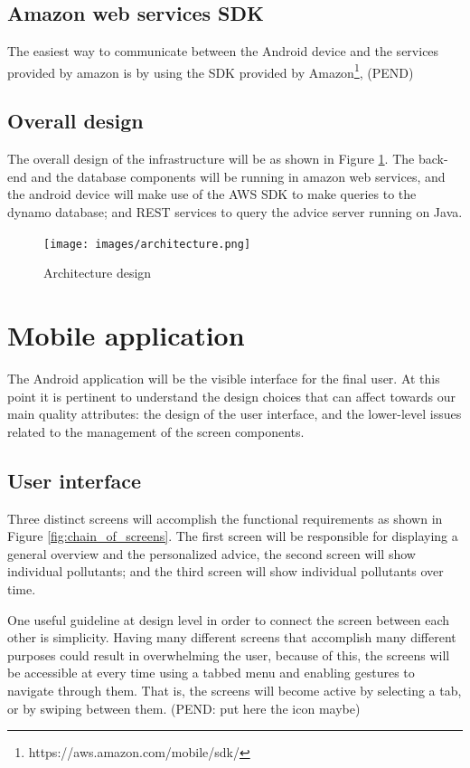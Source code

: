 \subsection{Amazon web services SDK}
The easiest way to communicate between the Android device and the services provided by amazon is by using the SDK provided by Amazon\footnote{https://aws.amazon.com/mobile/sdk/}, (PEND)

\subsection{Overall design}
The overall design of the infrastructure will be as shown in Figure \ref{fig:architecture}. The back-end and the database components will be running in amazon web services, and the android device will make use of the AWS SDK to make queries to the dynamo database; and REST services to query the advice server running on Java.

\begin{figure}[H]
\begin{adjustbox}{width=.8\textwidth,center=\textwidth}
  \centering
  \texttt{[image: images/architecture.png]}
\end{adjustbox}
  \caption[Architecture design]{Architecture design}
  \label{fig:architecture}
\end{figure}

\section{Mobile application}
The Android application will be the visible interface for the final user. At this point it is pertinent to understand the design choices that can affect towards our main quality attributes: the design of the user interface, and the lower-level issues related to the management of the screen components. 

\subsection{User interface}
Three distinct screens will accomplish the functional requirements as shown in Figure \ref{fig:chain_of_screens}. The first screen will be responsible for displaying a general overview and the personalized advice, the second screen will show individual pollutants; and the third screen will show individual pollutants over time. 

One useful guideline at design level in order to connect the screen between each other is simplicity. Having many different screens that accomplish many different purposes could result in overwhelming the user, because of this, the screens will be accessible at every time using a tabbed menu and enabling gestures to navigate through them. That is, the screens will become active by selecting a tab, or by swiping between them.  (PEND: put here the icon maybe)

